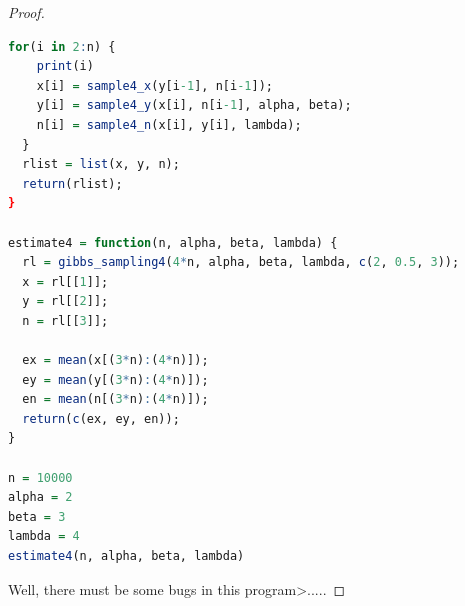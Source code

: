 \documentclass{article}
\begin{document}
\begin{proof}
\begin{lstlisting}[language = {R}]
  for(i in 2:n) {
    print(i)
    x[i] = sample4_x(y[i-1], n[i-1]);
    y[i] = sample4_y(x[i], n[i-1], alpha, beta);
    n[i] = sample4_n(x[i], y[i], lambda);
  }
  rlist = list(x, y, n);
  return(rlist);
}

estimate4 = function(n, alpha, beta, lambda) {
  rl = gibbs_sampling4(4*n, alpha, beta, lambda, c(2, 0.5, 3));
  x = rl[[1]];
  y = rl[[2]];
  n = rl[[3]];
  
  ex = mean(x[(3*n):(4*n)]);
  ey = mean(y[(3*n):(4*n)]);
  en = mean(n[(3*n):(4*n)]);
  return(c(ex, ey, en));
}

n = 10000
alpha = 2
beta = 3
lambda = 4
estimate4(n, alpha, beta, lambda)
\end{lstlisting}
Well, there must be some bugs in this program>.....
\end{proof}
\end{document}

